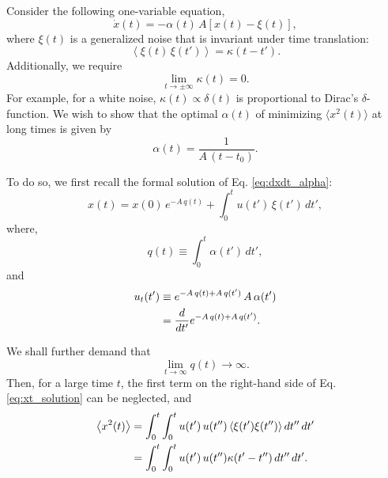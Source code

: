 \documentclass[reprint]{revtex4-1}
\begin{document}
Consider the following one-variable equation,
%
\begin{equation}
\dot x(t) = -\alpha(t) \, A \left[ x(t) - \xi(t) \right],
\label{eq:dxdt_alpha}
\end{equation}
%
where $\xi(t)$ is a generalized noise
that is invariant under time translation:
%
\begin{equation}
\left\langle \xi(t) \, \xi(t') \right\rangle
=
\kappa(t - t').
\label{eq:noise_correlation}
\end{equation}
%
Additionally, we require
\begin{equation}
  \lim_{t \rightarrow \pm\infty} \kappa(t) = 0.
  \label{eq:kappat_limit}
\end{equation}
%
For example, for a white noise,
$\kappa(t) \propto \delta(t)$
is proportional to Dirac's $\delta$-function.
%
We wish to show that the optimal $\alpha(t)$
of minimizing $\langle x^2(t) \rangle$ at long times
is given by
%
\begin{equation}
  \alpha(t) = \frac{1}{A \, (t - t_0)}.
\label{eq:alpha_opt}
\end{equation}
%





To do so, we first recall
the formal solution of Eq. \eqref{eq:dxdt_alpha}:
%
\begin{equation}
x(t) = x(0) \, e^{-A \, q(t)}
+ \int_0^t u(t') \, \xi(t') \, dt',
\label{eq:xt_solution}
\end{equation}
%
where,
%
\begin{equation}
q(t) \equiv \int_0^t \alpha(t') \, dt',
\label{eq:qt_definition}
\end{equation}
%
and
%
\begin{align}
u_t(t')
&\equiv
e^{-A \, q(t) + A \, q(t') } \, A \, \alpha(t')
\notag
\\
&=
\frac{d}{dt'} e^{-A \, q(t) + A \, q(t')}.
\label{eq:ut_definition}
\end{align}


We shall further demand that
%
\begin{equation}
  \lim_{t \to \infty} q(t) \to \infty.
  \label{eq:qt_limit}
\end{equation}
%
Then, for a large time $t$,
the first term on the right-hand side
of Eq. \eqref{eq:xt_solution} can be neglected, and
%
\begin{align}
\left\langle x^2(t) \right\rangle
&=
\int_0^t \int_0^t u(t') \, u(t'')
    \left\langle \xi(t') \xi(t'') \right\rangle dt'' \, dt'
\notag
\\
&=
\int_0^t \int_0^t u(t') \, u(t'') \kappa(t' - t'') \, dt'' \, dt'.
\label{eq:x2t_average}
\end{align}
\end{document}
